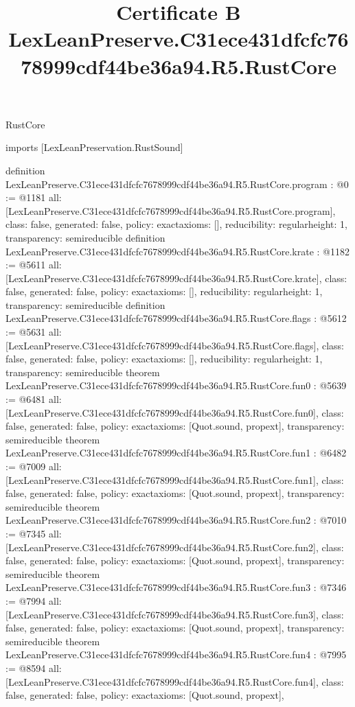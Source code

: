 \begin{lexlean}{RustCore}
\title{Certificate B LexLeanPreserve.C31ece431dfcfc7678999cdf44be36a94.R5.RustCore}
\begin{coremodule}
imports [LexLeanPreservation.RustSound]

definition LexLeanPreserve.C31ece431dfcfc7678999cdf44be36a94.R5.RustCore.program : @0 := @1181 {
  all: [LexLeanPreserve.C31ece431dfcfc7678999cdf44be36a94.R5.RustCore.program],
  class: false,
  generated: false,
  policy: exact{axioms: []},
  reducibility: regular{height: 1},
  transparency: semireducible
}
definition LexLeanPreserve.C31ece431dfcfc7678999cdf44be36a94.R5.RustCore.krate : @1182 := @5611 {
  all: [LexLeanPreserve.C31ece431dfcfc7678999cdf44be36a94.R5.RustCore.krate],
  class: false,
  generated: false,
  policy: exact{axioms: []},
  reducibility: regular{height: 1},
  transparency: semireducible
}
definition LexLeanPreserve.C31ece431dfcfc7678999cdf44be36a94.R5.RustCore.flags : @5612 := @5631 {
  all: [LexLeanPreserve.C31ece431dfcfc7678999cdf44be36a94.R5.RustCore.flags],
  class: false,
  generated: false,
  policy: exact{axioms: []},
  reducibility: regular{height: 1},
  transparency: semireducible
}
theorem LexLeanPreserve.C31ece431dfcfc7678999cdf44be36a94.R5.RustCore.fun0 : @5639 := @6481 {
  all: [LexLeanPreserve.C31ece431dfcfc7678999cdf44be36a94.R5.RustCore.fun0],
  class: false,
  generated: false,
  policy: exact{axioms: [Quot.sound, propext]},
  transparency: semireducible
}
theorem LexLeanPreserve.C31ece431dfcfc7678999cdf44be36a94.R5.RustCore.fun1 : @6482 := @7009 {
  all: [LexLeanPreserve.C31ece431dfcfc7678999cdf44be36a94.R5.RustCore.fun1],
  class: false,
  generated: false,
  policy: exact{axioms: [Quot.sound, propext]},
  transparency: semireducible
}
theorem LexLeanPreserve.C31ece431dfcfc7678999cdf44be36a94.R5.RustCore.fun2 : @7010 := @7345 {
  all: [LexLeanPreserve.C31ece431dfcfc7678999cdf44be36a94.R5.RustCore.fun2],
  class: false,
  generated: false,
  policy: exact{axioms: [Quot.sound, propext]},
  transparency: semireducible
}
theorem LexLeanPreserve.C31ece431dfcfc7678999cdf44be36a94.R5.RustCore.fun3 : @7346 := @7994 {
  all: [LexLeanPreserve.C31ece431dfcfc7678999cdf44be36a94.R5.RustCore.fun3],
  class: false,
  generated: false,
  policy: exact{axioms: [Quot.sound, propext]},
  transparency: semireducible
}
theorem LexLeanPreserve.C31ece431dfcfc7678999cdf44be36a94.R5.RustCore.fun4 : @7995 := @8594 {
  all: [LexLeanPreserve.C31ece431dfcfc7678999cdf44be36a94.R5.RustCore.fun4],
  class: false,
  generated: false,
  policy: exact{axioms: [Quot.sound, propext]},
}
\end{coremodule}
\end{lexlean}

